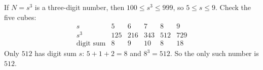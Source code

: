 If $N=s^3$ is a three-digit number, then $100\le s^3\le999$, so $5\le s\le9$. Check the five cubes:
\[
\begin{array}{c|ccccc}
s&5&6&7&8&9\\\hline
s^3&125&216&343&512&729\\
\text{digit sum}&8&9&10&8&18
\end{array}
\]
Only $512$ has digit sum $s$: $5+1+2=8$ and $8^3=512$. So the only such number is $\boxed{512}$.
